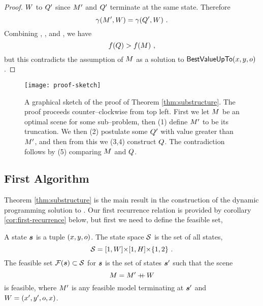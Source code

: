 \begin{proof}
  $\Wall$ to $\CfTruncScene$ since $\TruncScene$ and $\CfTruncScene$
  terminate at the same state. Therefore
  \begin{equation}
    \label{eq:equal-penalties}
    \CornerPenalty(\TruncScene,\Wall) =
    \CornerPenalty(\CfTruncScene,\Wall) ~.
  \end{equation}
  Combining , , and
  , we have
  \begin{equation}
    \Objective(\CfScene) > \Objective(\Scene) ~,
  \end{equation}
  but this contradicts the assumption of $\Scene$ as a solution to
  $\SubProb(x,y,\WallOrient)$.
\end{proof}

\begin{figure}[tb]
  \centering
  \texttt{[image: proof-sketch]}
  \caption{A graphical sketch of the proof of Theorem
    \ref{thm:substructure}. The proof proceeds counter--clockwise from top
    left. First we let $\Scene$ be an optimal scene for some
    sub--problem, then (1) define $\TruncScene$ to be its
    truncation. We then (2) postulate some $\CfTruncScene$ with value
    greater than $\TruncScene$, and then from this we (3,4) construct
    $\CfScene$. The contradiction follows by (5) comparing $\Scene$
    and $\CfScene$.}
  \label{fig:proof-sketch}
\end{figure}





\subsection{First Algorithm}
Theorem \ref{thm:substructure} is the main result in the construction
of the dynamic programming solution to . Our first
recurrence relation is provided by corollary
\ref{cor:first-recurrence} below, but first we need to define the
feasible set,
\begin{definition}
  A state $\State$ is a tuple $(x,y,\WallOrient)$. The state space
  $\StateSpace$ is the set of all states,
  \begin{equation}
    \StateSpace = [1,\Width] \cross [1,\Height] \cross \{1,2\} ~.
  \end{equation}
  The feasible set $\FeasibleSet(\State) \subset \StateSpace$ for
  $\State$ is the set of states $\State'$ such that the scene
  \begin{equation}
    \Scene = \Scene' \concat \Wall
  \end{equation}
  is feasible, where $\Scene'$ is any feasible model terminating at
  $\State'$ and $\Wall=(x',y',\WallOrient,x)$.
\end{definition}

